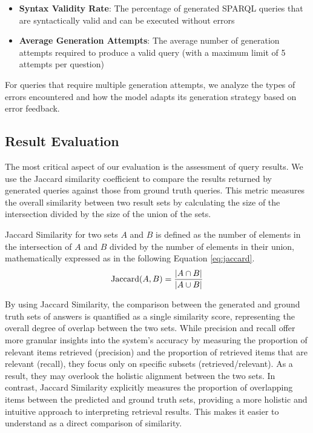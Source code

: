 \begin{itemize}
    \item \textbf{Syntax Validity Rate}: The percentage of generated SPARQL queries that are syntactically valid and can be executed without errors
    \item \textbf{Average Generation Attempts}: The average number of generation attempts required to produce a valid query (with a maximum limit of 5 attempts per question)
\end{itemize}

For queries that require multiple generation attempts, we analyze the types of errors encountered and how the model adapts its generation strategy based on error feedback.

\subsection{Result Evaluation}
\label{result-evaluation-methodology}
The most critical aspect of our evaluation is the assessment of query results. We use the Jaccard similarity coefficient to compare the results returned by generated queries against those from ground truth queries. This metric measures the overall similarity between two result sets by calculating the size of the intersection divided by the size of the union of the sets.

Jaccard Similarity for two sets $A$ and $B$ is defined as the number of elements in the intersection of $A$ and $B$ divided by the number of elements in their union, mathematically expressed as in the following Equation \ref{eq:jaccard}.
    \begin{equation}
        \textnormal{Jaccard}(A, B)=\frac{|A \cap B|}{|A \cup B|}
        \label{eq:jaccard}
    \end{equation}

By using Jaccard Similarity, the comparison between the generated and 
ground truth sets of answers is quantified as a single similarity 
score, representing the overall degree of overlap between the two sets. 
While precision and recall offer more granular insights into the system's 
accuracy by measuring the proportion of relevant items retrieved (precision) 
and the proportion of retrieved items that are relevant (recall), they 
focus only on specific subsets (retrieved/relevant). As a result, they 
may overlook the holistic alignment between the two sets. In contrast, 
Jaccard Similarity explicitly measures the proportion of overlapping 
items between the predicted and ground truth sets, providing a more 
holistic and intuitive approach to interpreting retrieval results. This 
makes it easier to understand as a direct comparison of similarity.

